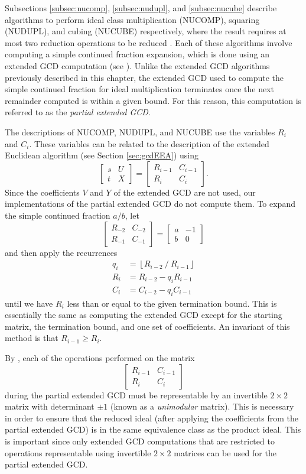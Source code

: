 \documentclass{ucalgthes1}
\theoremstyle{definition}
\newcommand{\matrixtt}[4]{\left[ \begin{array}{rr} #1 & #2 \\ #3 & #4 \end{array} \right]}
\newcommand{\floor}[1]{\left\lfloor #1 \right\rfloor}
\begin{document}
Subsections \ref{subsec:nucomp}, \ref{subsec:nudupl}, and \ref{subsec:nucube} describe algorithms to perform ideal class multiplication (NUCOMP), squaring (NUDUPL), and cubing (NUCUBE) respectively, where the result requires at most two reduction operations to be reduced \cite[p.122]{Jacobson2009}.  Each of these algorithms involve computing a simple continued fraction expansion, which is done using an extended GCD computation (see \cite[\S 3.2]{Jacobson2009}).  Unlike the extended GCD algorithms previously described in this chapter, the extended GCD used to compute the simple continued fraction for ideal multiplication terminates once the next remainder computed is within a given bound.  For this reason, this computation is referred to as the \emph{partial extended GCD}.

The descriptions of NUCOMP, NUDUPL, and NUCUBE use the variables $R_i$ and $C_i$.  These variables can be related to the description of the extended Euclidean algorithm (see Section \ref{sec:gcdEEA}) using
\[
	\matrixtt{s}{U}{t}{X} = \matrixtt{R_{i-1}}{C_{i-1}}{R_i}{C_i}.
\]
Since the coefficients $V$ and $Y$ of the extended GCD are not used, our implementations of the partial extended GCD do not compute them.
To expand the simple continued fraction $a/b$, let
\[
\matrixtt{R_{-2}}{C_{-2}}{R_{-1}}{C_{-1}} = \matrixtt{a}{-1}{b}{0}
\]
and then apply the recurrences
\begin{align*}
	q_i &= \floor{R_{i-2} ~/~ R_{i-1}} \\
	R_i &= R_{i-2} - q_i R_{i-1} \\
	C_i &= C_{i-2} - q_i C_{i-1}
\end{align*}
until we have $R_i$ less than or equal to the given termination bound.  This is essentially the same as computing the extended GCD except for the starting matrix, the termination bound, and one set of coefficients.  An invariant of this method is that $R_{i-1} \ge R_i$.

By \cite[\S 5.6.1]{Crandall2001}, each of the operations performed on the matrix
\[
\matrixtt{R_{i-1}}{C_{i-1}}{R_i}{C_i}
\]
during the partial extended GCD must be representable by an invertible $2 \times 2$ matrix with determinant $\pm 1$ (known as a \emph{unimodular} matrix).  This is necessary in order to ensure that the reduced ideal (after applying the coefficients from the partial extended GCD) is in the same equivalence class as the product ideal.  This is important since only extended GCD computations that are restricted to operations representable using invertible $2 \times 2$ matrices can be used for the partial extended GCD.
\end{document}
